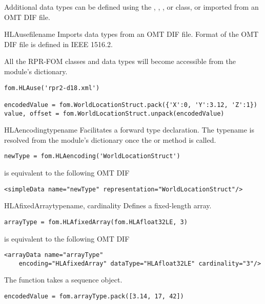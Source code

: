 Additional data types can be defined using the ,
, , or 
class, or imported from an OMT DIF file.

\begin{funcdesc}{HLAuse}{filename}
Imports data types from an OMT DIF file. Format of the OMT DIF file is
defined in IEEE 1516.2.

All the RPR-FOM classes and data types will become accessible from the
module's dictionary.

\begin{verbatim}
fom.HLAuse('rpr2-d18.xml')

encodedValue = fom.WorldLocationStruct.pack({'X':0, 'Y':3.12, 'Z':1})
value, offset = fom.WorldLocationStruct.unpack(encodedValue)
\end{verbatim}

\end{funcdesc}

\begin{classdesc}{HLAencoding}{typename}
Facilitates a forward type declaration. The typename is resolved from the
module's dictionary once the  or  method is called.

\begin{verbatim}
newType = fom.HLAencoding('WorldLocationStruct')
\end{verbatim}
is equivalent to the following OMT DIF
\begin{verbatim}
<simpleData name="newType" representation="WorldLocationStruct"/>
\end{verbatim}
\end{classdesc}

\begin{classdesc}{HLAfixedArray}{typename, cardinality}
Defines a fixed-length array.

\begin{verbatim}
arrayType = fom.HLAfixedArray(fom.HLAfloat32LE, 3)
\end{verbatim}
is equivalent to the following OMT DIF
\begin{verbatim}
<arrayData name="arrayType"
    encoding="HLAfixedArray" dataType="HLAfloat32LE" cardinality="3"/>
\end{verbatim}

The  function takes a sequence object.
\begin{verbatim}
encodedValue = fom.arrayType.pack([3.14, 17, 42])
\end{verbatim}
\end{classdesc}

